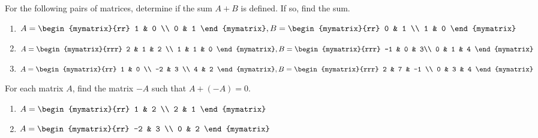 \begin{enumialphparenastyle}

\begin{ex} For the following pairs of matrices, determine if the sum $A + B$ is defined. If so, find the sum. 
\begin{enumerate}
\item
$A = \begin{mymatrix}{rr}
1 & 0 \\
0 & 1 
\end{mymatrix}, 
B = \begin{mymatrix}{rr}
0 & 1 \\
1 & 0 
\end{mymatrix}$

\item
$A = \begin{mymatrix}{rrr}
2 & 1 & 2 \\
1 & 1 & 0 
\end{mymatrix},  B = \begin{mymatrix}{rrr}
-1 & 0 & 3\\
0 & 1 & 4 
\end{mymatrix}$

\item 
$A = \begin{mymatrix}{rr}
1 & 0 \\
-2 & 3 \\
4 & 2 
\end{mymatrix}, B = \begin{mymatrix}{rrr}
2 & 7 & -1 \\
0 & 3 & 4  
\end{mymatrix}$
\end{enumerate}
\end{ex}

\begin{ex} For each matrix $A$, find the matrix $-A$ such that $A + (-A) = 0$. 
\begin{enumerate}
\item
$A = \begin{mymatrix}{rr}
1 & 2 \\
2 & 1 
\end{mymatrix}$

\item
$A = \begin{mymatrix}{rr}
-2 & 3 \\
0 & 2 
\end{mymatrix}$


\end{enumerate}
\end{ex}
\end{enumialphparenastyle}
